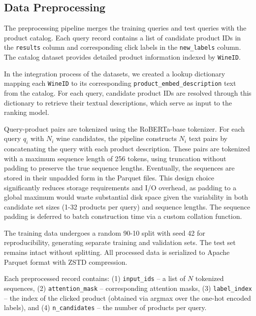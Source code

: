 \documentclass[10pt]{article}
\begin{document}
\subsection*{Data Preprocessing}
The preprocessing pipeline merges the training queries and test queries with the product catalog. Each query record contains a list of candidate product IDs in the \texttt{results} column and corresponding click labels in the \texttt{new\_labels} column. The catalog dataset provides detailed product information indexed by \texttt{WineID}.

\begin{sloppypar}
In the integration process of the datasets, we created a lookup dictionary mapping each \texttt{WineID} to its corresponding \texttt{product\_\allowbreak{}embed\_\allowbreak{}description} text from the catalog. For each query, candidate product IDs are resolved through this dictionary to retrieve their textual descriptions, which serve as input to the ranking model.
\end{sloppypar}

Query-product pairs are tokenized using the RoBERTa-base tokenizer. For each query $q_i$ with $N_i$ wine candidates, the pipeline constructs $N_i$ text pairs by concatenating the query with each product description. These pairs are tokenized with a maximum sequence length of 256 tokens, using truncation without padding to preserve the true sequence lengths. Eventually, the sequences are stored in their unpadded form in the Parquet files. This design choice significantly reduces storage requirements and I/O overhead, as padding to a global maximum would waste substantial disk space given the variability in both candidate set sizes (1-32 products per query) and sequence lengths. The sequence padding is deferred to batch construction time via a custom collation function.

The training data undergoes a random 90-10 split with seed 42 for reproducibility, generating separate training and validation sets. The test set remains intact without splitting. All processed data is serialized to Apache Parquet format with ZSTD compression.

Each preprocessed record contains: (1) \texttt{input\_ids} -- a list of $N$ tokenized sequences, (2) \texttt{attention\_mask} -- corresponding attention masks, (3) \texttt{label\_index} -- the index of the clicked product (obtained via argmax over the one-hot encoded labels), and (4) \texttt{n\_candidates} -- the number of products per query.
\end{document}

